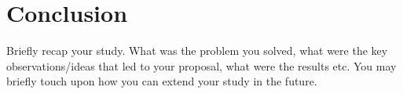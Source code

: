 \chapter{Conclusion}\label{ch:conclusion}

Briefly recap your study.
What was the problem you solved, what were the key observations/ideas that led to your proposal, what were the results etc.
You may briefly touch upon how you can extend your study in the future.